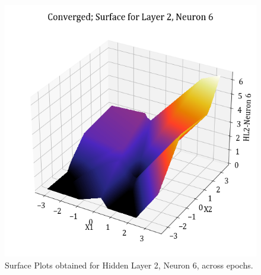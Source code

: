 \documentclass[11pt,a4paper]{article}
\begin{document}
\begin{figure}[H]
    \includegraphics[scale=0.4]{images/1B_MLFFNN_conv_HL2_N6.png}
    \caption{Surface Plots obtained for Hidden Layer 2, Neuron 6, across epochs.}
\end{figure}
\end{document}

